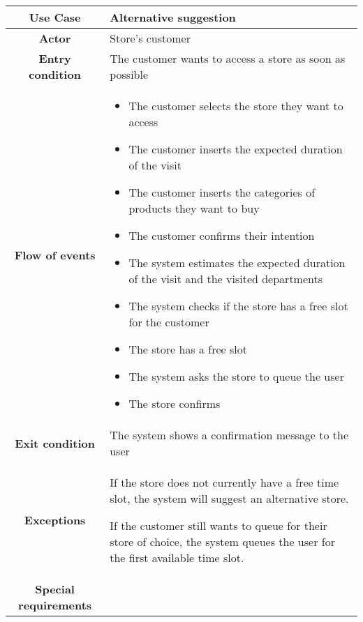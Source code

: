 \documentclass[../../main.tex]{subfiles}
\begin{document}
    \begin{table}[H]
      \centering
        \begin{tabular}{c m{}}
        \hline
        \textbf{Use Case} & Alternative suggestion\\ \hline
        \textbf{Actor} & Store's customer\\ \hline
        \textbf{Entry condition} & The customer wants to access a store as soon as possible\\  \hline
        \textbf{Flow of events} & \begin{itemize}
                                    \item The customer selects the store they want to access
                                    \item The customer inserts the expected duration of the visit
                                    \item The customer inserts the categories of products they want to buy
                                    \item The customer confirms their intention
                                    \item The system estimates the expected duration of the visit and the visited departments
                                    \item The system checks if the store has a free slot for the customer
                                    \item The store has a free slot
                                    \item The system asks the store to queue the user
                                    \item The store confirms
                                  \end{itemize}\\ \hline
        \textbf{Exit condition} & The system shows a confirmation message to the user \\ \hline
        \textbf{Exceptions} &  If the store does not currently have a free time slot, the system will suggest an alternative store.
                                
                               If the customer still wants to queue for their store of choice, the system queues the user for the first available time slot. \\ \hline
        \textbf{Special requirements} &\\ \hline
        \end{tabular}
    \end{table}
\end{document}
